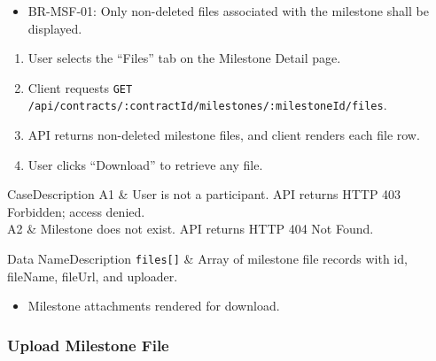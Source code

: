 \begin{itemize}[leftmargin=1.6em,topsep=3pt,itemsep=2pt,parsep=0pt,label=$\bullet$]\brrulelist
      \item BR-MSF-01: Only non-deleted files associated with the milestone shall be displayed.
\end{itemize}

\begin{enumerate}[leftmargin=1.8em,topsep=3pt,itemsep=2pt,parsep=0pt]
      \item User selects the ``Files'' tab on the Milestone Detail page.
      \item Client requests \texttt{GET /\allowbreak{}api/\allowbreak{}contracts/\allowbreak{}:\allowbreak{}contractId/\allowbreak{}milestones/\allowbreak{}:\allowbreak{}milestoneId/\allowbreak{}files}.
      \item API returns non-deleted milestone files, and client renders each file row.
      \item User clicks ``Download'' to retrieve any file.
\end{enumerate}

\begin{flowtable}{Case}{Description}
      A1 & User is not a participant. API returns HTTP 403 Forbidden; access denied.\\ \hline
      A2 & Milestone does not exist. API returns HTTP 404 Not Found.\\ \hline
\end{flowtable}

\begin{specdatatable}{Data Name}{Description}
      \texttt{files[]} & Array of milestone file records with id, fileName, fileUrl, and uploader.\\ \hline
\end{specdatatable}

\begin{itemize}[leftmargin=1.6em,topsep=3pt,itemsep=2pt,parsep=0pt,label=$\bullet$]
      \item Milestone attachments rendered for download.
\end{itemize}

\subsubsection{ Upload Milestone File}

